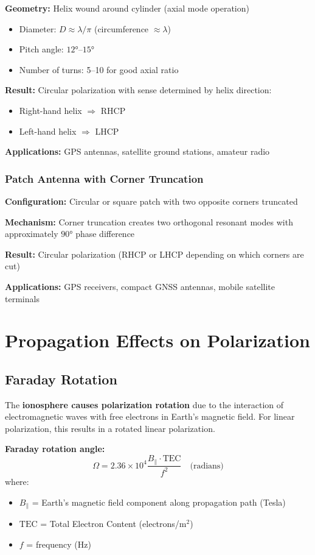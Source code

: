 \textbf{Geometry:} Helix wound around cylinder (axial mode operation)
\begin{itemize}
\item Diameter: $D \approx \lambda/\pi$ (circumference $\approx \lambda$)
\item Pitch angle: $12°$--$15°$
\item Number of turns: 5--10 for good axial ratio
\end{itemize}

\textbf{Result:} Circular polarization with sense determined by helix direction:
\begin{itemize}
\item Right-hand helix $\Rightarrow$ RHCP
\item Left-hand helix $\Rightarrow$ LHCP
\end{itemize}

\textbf{Applications:} GPS antennas, satellite ground stations, amateur radio

\subsubsection{Patch Antenna with Corner Truncation}

\textbf{Configuration:} Circular or square patch with two opposite corners truncated

\textbf{Mechanism:} Corner truncation creates two orthogonal resonant modes with approximately $90°$ phase difference

\textbf{Result:} Circular polarization (RHCP or LHCP depending on which corners are cut)

\textbf{Applications:} GPS receivers, compact GNSS antennas, mobile satellite terminals

\section{Propagation Effects on Polarization}

\subsection{Faraday Rotation}

The \textbf{ionosphere causes polarization rotation} due to the interaction of electromagnetic waves with free electrons in Earth's magnetic field. For linear polarization, this results in a rotated linear polarization.

\textbf{Faraday rotation angle:}
\begin{equation}
\Omega = 2.36 \times 10^4 \frac{B_\parallel \cdot \mathrm{TEC}}{f^2} \quad \text{(radians)}
\label{eq:faraday-rotation}
\end{equation}
where:
\begin{itemize}
\item $B_\parallel$ = Earth's magnetic field component along propagation path (Tesla)
\item $\mathrm{TEC}$ = Total Electron Content (electrons/m$^2$)
\item $f$ = frequency (Hz)
\end{itemize}

